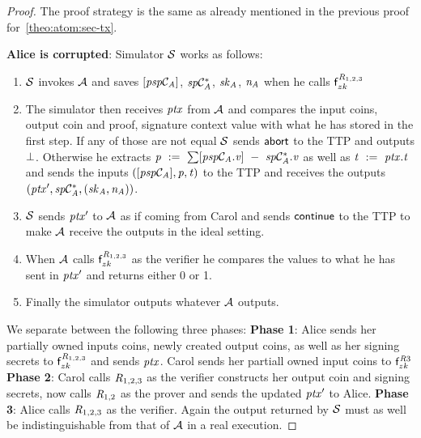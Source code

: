 \begin{proof}
    The proof strategy is the same as already mentioned in the previous proof for~\cref{theo:atom:sec-tx}.

    \textbf{Alice is corrupted}: Simulator $\mathcal{S}$ works as follows:
    \begin{enumerate}
        \item $\mathcal{S}$ invokes $\mathcal{A}$ and saves $[\mathit{psp}\mathcal{C}_{\mathit{A}}]$, $\mathit{sp}\mathcal{C}_{\mathit{A}}^*$, $\mathit{sk}_{\mathit{A}}$, $\mathit{\mathit{n}_{\mathit{A}}}$ when he calls $\mathsf{f}^{\mathit{R}_{1,2,3}}_{zk}$
        \item The simulator then receives $\mathit{ptx}$ from $\mathcal{A}$ and compares the input coins, output coin and proof, signature context value with what he has stored in the first step.
        If any of those are not equal $\mathcal{S}$ sends $\mathsf{abort}$ to the TTP and outputs $\bot$.
        Otherwise he extracts $\mathit{p} ~:=~ \sum [\mathit{psp}\mathcal{C}_{\mathit{A}}.\mathit{v}] ~-~ \mathit{sp}\mathcal{C}_{\mathit{A}}^*.\mathit{v}$ as well as $\mathit{t} ~:=~ \mathit{ptx}.\mathit{t}$ and sends the inputs $([\mathit{psp}\mathcal{C}_{\mathit{A}}], \mathit{p}, \mathit{t})$ to the TTP and receives the outputs $({\mathit{ptx}}', \mathit{sp}\mathcal{C}_{\mathit{A}}^*, (\mathit{sk}_{\mathit{A}}, \mathit{\mathit{n}_{\mathit{A}}}))$.
        \item $\mathcal{S}$ sends ${\mathit{ptx}}'$ to $\mathcal{A}$ as if coming from Carol and sends $\mathsf{continue}$ to the TTP to make $\mathcal{A}$ receive the outputs in the ideal setting.
        \item When $\mathcal{A}$ calls $\mathsf{f}^{\mathit{R}_{1,2,3}}_{zk}$ as the verifier he compares the values to what he has sent in ${\mathit{ptx}}'$ and returns either 0 or 1.
        \item Finally the simulator outputs whatever $\mathcal{A}$ outputs.
    \end{enumerate}
    We separate between the following three phases:
    \textbf{Phase 1}: Alice sends her partially owned inputs coins, newly created output coins, as well as her signing secrets to $\mathsf{f}^{\mathit{R}_{1,2,3}}_{zk}$ and sends $\mathit{ptx}$.
    Carol sends her partiall owned input coins to $\mathsf{f}^{\mathit{R}{3}}_{zk}$
    \textbf{Phase 2}: Carol calls $\mathit{R}_{1,2,3}$ as the verifier constructs her output coin and signing secrets, now calls $\mathit{R}_{1,2}$ as the prover and sends the updated ${\mathit{ptx}}'$ to Alice.
    \textbf{Phase 3}: Alice calls $\mathit{R}_{1,2,3}$ as the verifier.
    Again the output returned by $\mathcal{S}$ must as well be indistinguishable from that of $\mathcal{A}$ in a real execution.


\end{proof}
